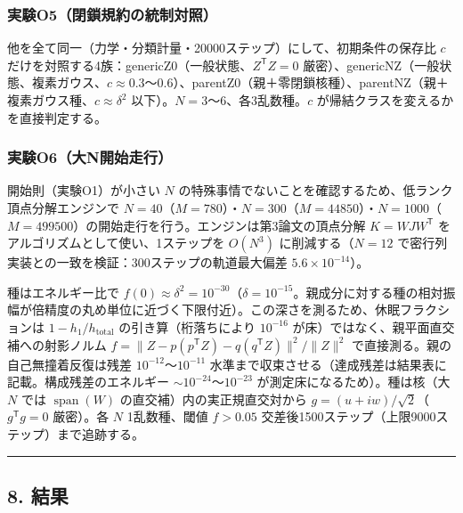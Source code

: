 \documentclass[
  a4paper,
]{ltjsarticle}
\begin{document}
\subsubsection{実験O5（閉鎖規約の統制対照）}\label{ux5b9fux9a13o5ux9589ux9396ux898fux7d04ux306eux7d71ux5236ux5bfeux7167}

他を全て同一（力学・分類計量・20000ステップ）にして、初期条件の保存比
\(c\) だけを対照する4族：genericZ0（一般状態、\(Z^{\mathsf T}Z=0\)
厳密）、genericNZ（一般状態、複素ガウス、\(c\approx0.3\)〜\(0.6\)）、parentZ0（親＋零閉鎖核種）、parentNZ（親＋複素ガウス種、\(c\approx\delta^2\)
以下）。\(N=3\)〜\(6\)、各3乱数種。\(c\)
が帰結クラスを変えるかを直接判定する。

\subsubsection{実験O6（大N開始走行）}\label{ux5b9fux9a13o6ux5927nux958bux59cbux8d70ux884c}

開始則（実験O1）が小さい \(N\)
の特殊事情でないことを確認するため、低ランク頂点分解エンジンで
\(N=40\)（\(M=780\)）・\(N=300\)（\(M=44850\)）・\(N=1000\)（\(M=499500\)）の開始走行を行う。エンジンは第3論文の頂点分解
\(K=WJW^{\mathsf T}\) をアルゴリズムとして使い、1ステップを \(O(N^3)\)
に削減する（\(N=12\)
で密行列実装との一致を検証：300ステップの軌道最大偏差
\(5.6\times10^{-14}\)）。

種はエネルギー比で
\(f(0)\approx\delta^2=10^{-30}\)（\(\delta=10^{-15}\)。親成分に対する種の相対振幅が倍精度の丸め単位に近づく下限付近）。この深さを測るため、休眠フラクションは
\(1-h_1/h_{\mathrm{total}}\) の引き算（桁落ちにより \(10^{-16}\)
が床）ではなく、親平面直交補への射影ノルム
\(f=\lVert Z-p(p^{\mathsf T}Z)-q(q^{\mathsf T}Z)\rVert^2/\lVert Z\rVert^2\)
で直接測る。親の自己無撞着反復は残差 \(10^{-12}\)〜\(10^{-11}\)
水準まで収束させる（達成残差は結果表に記載。構成残差のエネルギー
\(\sim10^{-24}\)〜\(10^{-23}\) が測定床になるため）。種は核（大 \(N\)
では \(\operatorname{span}(W)\) の直交補）内の実正規直交対から
\(g=(u+iw)/\sqrt2\)（\(g^{\mathsf T}g=0\) 厳密）。各 \(N\) 1乱数種、閾値
\(f>0.05\) 交差後1500ステップ（上限9000ステップ）まで追跡する。

\begin{center}\rule{0.5\linewidth}{0.5pt}\end{center}

\subsection{8. 結果}\label{ux7d50ux679c}
\end{document}
